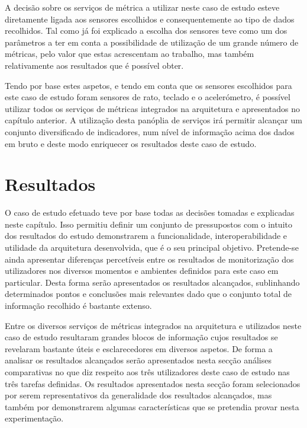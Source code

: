 A decisão sobre os serviços de métrica a utilizar neste caso de estudo esteve diretamente ligada aos sensores escolhidos e consequentemente ao tipo de dados recolhidos. Tal como já foi explicado a escolha dos sensores teve como um dos parâmetros a ter em conta a possibilidade de utilização de um grande número de métricas, pelo valor que estas acrescentam ao trabalho, mas também relativamente aos resultados que é possível obter.

Tendo por base estes aspetos, e tendo em conta que os sensores escolhidos para este caso de estudo foram sensores de rato, teclado e o acelerómetro, é possível utilizar todos os serviços de métricas integrados na arquitetura e apresentados no capítulo anterior. A utilização desta panóplia de serviços irá permitir alcançar um conjunto diversificado de indicadores, num nível de informação acima dos dados em bruto e deste modo enriquecer os resultados deste caso de estudo.

\section{Resultados}

O caso de estudo efetuado teve por base todas as decisões tomadas e explicadas neste capítulo. Isso permitiu definir um conjunto de pressupostos com o intuito dos resultados do estudo demonstrarem a funcionalidade, interoperabilidade e utilidade da arquitetura desenvolvida, que é o seu principal objetivo. Pretende-se ainda apresentar diferenças percetíveis entre os resultados de monitorização dos utilizadores nos diversos momentos e ambientes definidos para este caso em particular. Desta forma serão apresentados os resultados alcançados, sublinhando determinados pontos e conclusões mais relevantes dado que o conjunto total de informação recolhido é bastante extenso.

Entre os diversos serviços de métricas integrados na arquitetura e utilizados neste caso de estudo resultaram grandes blocos de informação cujos resultados se revelaram bastante úteis e esclarecedores em diversos aspetos. De forma a analisar os resultados alcançados serão apresentados nesta secção análises comparativas no que diz respeito aos três utilizadores deste caso de estudo nas três tarefas definidas. Os resultados apresentados nesta secção foram selecionados por serem representativos da generalidade dos resultados alcançados, mas também por demonstrarem algumas características que se pretendia provar nesta experimentação.


